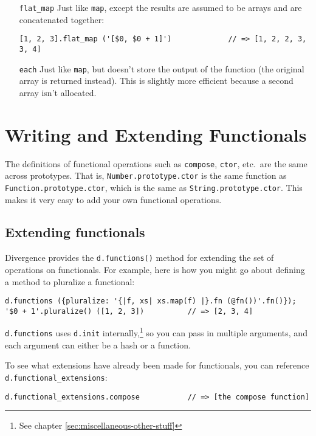 \documentclass{report}
\begin{document}
\begin{enumerate}
\item[{\tt flat\_map}] Just like \verb|map|, except the results are assumed to be arrays and are concatenated together:

\begin{verbatim}
[1, 2, 3].flat_map ('[$0, $0 + 1]')             // => [1, 2, 2, 3, 3, 4]
\end{verbatim}

\item[{\tt each}]     Just like \verb|map|, but doesn't store the output of the function (the original array is returned instead). This is slightly more efficient because a second array
                        isn't allocated.
\end{enumerate}

\chapter {Writing and Extending Functionals}
    \label{sec:writing-and-extending-functionals}

    The definitions of functional operations such as \verb|compose|, \verb|ctor|, etc.~are the same across prototypes. That is, \verb|Number.prototype.ctor| is the same function as
    \verb|Function.prototype.ctor|, which is the same as \verb|String.prototype.ctor|. This makes it very easy to add your own functional operations.

\section {Extending functionals}
      Divergence provides the \verb|d.functions()| method for extending the set of operations on functionals. For example, here is how you might go about defining a method to pluralize a
      functional:

\begin{verbatim}
d.functions ({pluralize: '{|f, xs| xs.map(f) |}.fn (@fn())'.fn()});
'$0 + 1'.pluralize() ([1, 2, 3])          // => [2, 3, 4]
\end{verbatim}

      \verb|d.functions| uses \verb|d.init| internally,\footnote{See chapter \ref{sec:miscellaneous-other-stuff}} so you can pass in multiple arguments, and each argument can either be a hash
      or a function.

      To see what extensions have already been made for functionals, you can reference \verb|d.functional_extensions|:

\begin{verbatim}
d.functional_extensions.compose           // => [the compose function]
\end{verbatim}
\end{document}
